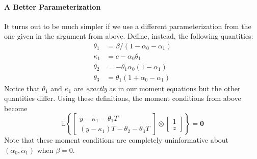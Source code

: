 \documentclass[12pt]{article}
\begin{document}
\paragraph{A Better Parameterization}
It turns out to be much simpler if we use a different parameterization from the one given in the argument from above.
Define, instead, the following quantities:
\begin{align*}
  \theta_1 &= \beta/(1 - \alpha_0 - \alpha_1)\\
  \kappa_1 &= c - \alpha_0 \theta_1 \\
  \theta_2 &= -\theta_1 \alpha_0(1 - \alpha_1)\\
  \theta_3 &= \theta_1 (1 + \alpha_0 - \alpha_1)
\end{align*}
Notice that $\theta_1$ and $\kappa_1$ are \emph{exactly} as in our moment equations but the other quantities differ.
Using these definitions, the moment conditions from above become
\[
  \mathbb{E}\left\{ \left[
    \begin{array}{c}
    y - \kappa_1 - \theta_1 T\\
    (y - \kappa_1) T - \theta_2 - \theta_3 T
  \end{array}
\right]\otimes
\left[
\begin{array}{c}
1 \\ z
\end{array}
\right]\right\} = \mathbf{0}
\]
Note that these moment conditions are completely uninformative about $(\alpha_0, \alpha_1)$ when $\beta = 0$.
\end{document}
